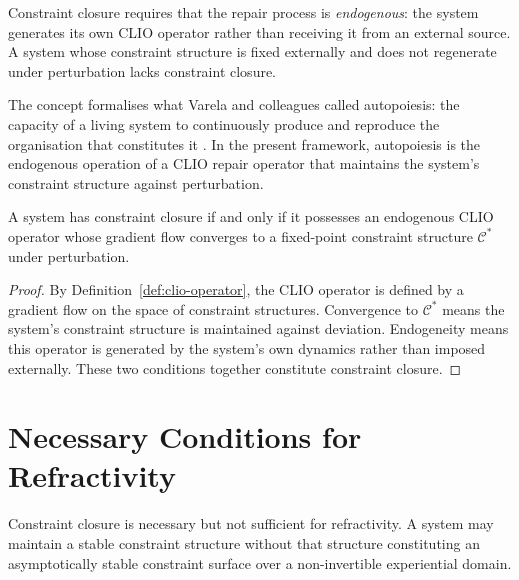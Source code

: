 \documentclass[11pt,openany]{book}
\begin{document}
\begin{remark}
Constraint closure requires that the repair process is
\emph{endogenous}: the system generates its own CLIO
operator rather than receiving it from an external source.
A system whose constraint structure is fixed externally and
does not regenerate under perturbation lacks constraint
closure.
\end{remark}

The concept formalises what Varela and colleagues called
autopoiesis: the capacity of a living system to continuously
produce and reproduce the organisation that constitutes it
\citep{varela1991embodied}.  In the present framework,
autopoiesis is the endogenous operation of a CLIO repair
operator that maintains the system's constraint structure
against perturbation.

\begin{proposition}
\label{prop:closure-clio}
A system has constraint closure if and only if it possesses
an endogenous CLIO operator whose gradient flow converges
to a fixed-point constraint structure $\mathcal{C}^*$
under perturbation.
\end{proposition}

\begin{proof}
By Definition~\ref{def:clio-operator}, the CLIO operator is
defined by a gradient flow on the space of constraint
structures.  Convergence to $\mathcal{C}^*$ means the
system's constraint structure is maintained against
deviation.  Endogeneity means this operator is generated by
the system's own dynamics rather than imposed externally.
These two conditions together constitute constraint closure.
\end{proof}

\section{Necessary Conditions for Refractivity}
\label{sec:conditions-refractivity}

Constraint closure is necessary but not sufficient for
refractivity.  A system may maintain a stable constraint
structure without that structure constituting an
asymptotically stable constraint surface over a
non-invertible experiential domain.
\end{document}

